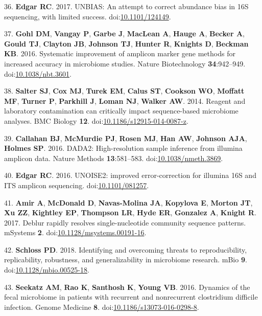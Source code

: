 \documentclass[11,]{article}
\begin{document}
36. \textbf{Edgar RC}. 2017. UNBIAS: An attempt to correct abundance
bias in 16S sequencing, with limited success.
doi:\href{http://dx.doi.org/10.1101/124149}{10.1101/124149}.

37. \textbf{Gohl DM}, \textbf{Vangay P}, \textbf{Garbe J},
\textbf{MacLean A}, \textbf{Hauge A}, \textbf{Becker A}, \textbf{Gould
TJ}, \textbf{Clayton JB}, \textbf{Johnson TJ}, \textbf{Hunter R},
\textbf{Knights D}, \textbf{Beckman KB}. 2016. Systematic improvement of
amplicon marker gene methods for increased accuracy in microbiome
studies. Nature Biotechnology \textbf{34}:942--949.
doi:\href{http://dx.doi.org/10.1038/nbt.3601}{10.1038/nbt.3601}.

38. \textbf{Salter SJ}, \textbf{Cox MJ}, \textbf{Turek EM},
\textbf{Calus ST}, \textbf{Cookson WO}, \textbf{Moffatt MF},
\textbf{Turner P}, \textbf{Parkhill J}, \textbf{Loman NJ},
\textbf{Walker AW}. 2014. Reagent and laboratory contamination can
critically impact sequence-based microbiome analyses. BMC Biology
\textbf{12}.
doi:\href{http://dx.doi.org/10.1186/s12915-014-0087-z}{10.1186/s12915-014-0087-z}.

39. \textbf{Callahan BJ}, \textbf{McMurdie PJ}, \textbf{Rosen MJ},
\textbf{Han AW}, \textbf{Johnson AJA}, \textbf{Holmes SP}. 2016. DADA2:
High-resolution sample inference from illumina amplicon data. Nature
Methods \textbf{13}:581--583.
doi:\href{http://dx.doi.org/10.1038/nmeth.3869}{10.1038/nmeth.3869}.

40. \textbf{Edgar RC}. 2016. UNOISE2: improved error-correction for
illumina 16S and ITS amplicon sequencing.
doi:\href{http://dx.doi.org/10.1101/081257}{10.1101/081257}.

41. \textbf{Amir A}, \textbf{McDonald D}, \textbf{Navas-Molina JA},
\textbf{Kopylova E}, \textbf{Morton JT}, \textbf{Xu ZZ},
\textbf{Kightley EP}, \textbf{Thompson LR}, \textbf{Hyde ER},
\textbf{Gonzalez A}, \textbf{Knight R}. 2017. Deblur rapidly resolves
single-nucleotide community sequence patterns. mSystems \textbf{2}.
doi:\href{http://dx.doi.org/10.1128/msystems.00191-16}{10.1128/msystems.00191-16}.

42. \textbf{Schloss PD}. 2018. Identifying and overcoming threats to
reproducibility, replicability, robustness, and generalizability in
microbiome research. mBio \textbf{9}.
doi:\href{http://dx.doi.org/10.1128/mbio.00525-18}{10.1128/mbio.00525-18}.

43. \textbf{Seekatz AM}, \textbf{Rao K}, \textbf{Santhosh K},
\textbf{Young VB}. 2016. Dynamics of the fecal microbiome in patients
with recurrent and nonrecurrent clostridium difficile infection. Genome
Medicine \textbf{8}.
doi:\href{http://dx.doi.org/10.1186/s13073-016-0298-8}{10.1186/s13073-016-0298-8}.
\end{document}

